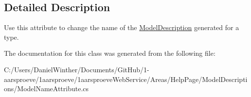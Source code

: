 \subsection{Detailed Description}
Use this attribute to change the name of the \hyperlink{class__1aarsproeve_web_service_1_1_areas_1_1_help_page_1_1_model_descriptions_1_1_model_description}{Model\+Description} generated for a type. 



The documentation for this class was generated from the following file\+:\begin{DoxyCompactItemize}
\item 
C\+:/\+Users/\+Daniel\+Winther/\+Documents/\+Git\+Hub/1-\/aarsproeve/1aarsproeve/1aarsproeve\+Web\+Service/\+Areas/\+Help\+Page/\+Model\+Descriptions/Model\+Name\+Attribute.\+cs\end{DoxyCompactItemize}
